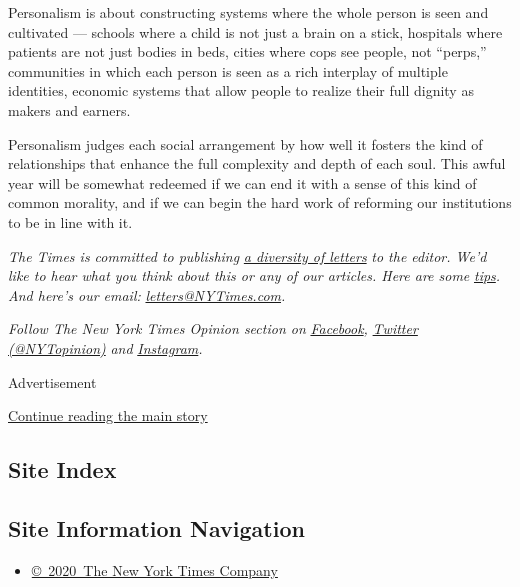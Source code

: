 Personalism is about constructing systems where the whole person is seen
and cultivated --- schools where a child is not just a brain on a stick,
hospitals where patients are not just bodies in beds, cities where cops
see people, not ``perps,'' communities in which each person is seen as a
rich interplay of multiple identities, economic systems that allow
people to realize their full dignity as makers and earners.

Personalism judges each social arrangement by how well it fosters the
kind of relationships that enhance the full complexity and depth of each
soul. This awful year will be somewhat redeemed if we can end it with a
sense of this kind of common morality, and if we can begin the hard work
of reforming our institutions to be in line with it.

\emph{The Times is committed to publishing}
\href{https://www.nytimes3xbfgragh.onion/2019/01/31/opinion/letters/letters-to-editor-new-york-times-women.html}{\emph{a
diversity of letters}} \emph{to the editor. We'd like to hear what you
think about this or any of our articles. Here are some}
\href{https://help.nytimes3xbfgragh.onion/hc/en-us/articles/115014925288-How-to-submit-a-letter-to-the-editor}{\emph{tips}}\emph{.
And here's our email:}
\href{mailto:letters@NYTimes.com}{\emph{letters@NYTimes.com}}\emph{.}

\emph{Follow The New York Times Opinion section on}
\href{https://www.facebookcorewwwi.onion/nytopinion}{\emph{Facebook}}\emph{,}
\href{http://twitter.com/NYTOpinion}{\emph{Twitter (@NYTopinion)}}
\emph{and}
\href{https://www.instagram.com/nytopinion/}{\emph{Instagram}}\emph{.}

Advertisement

\protect\hyperlink{after-bottom}{Continue reading the main story}

\hypertarget{site-index}{%
\subsection{Site Index}\label{site-index}}

\hypertarget{site-information-navigation}{%
\subsection{Site Information
Navigation}\label{site-information-navigation}}

\begin{itemize}
\tightlist
\item
  \href{https://help.nytimes3xbfgragh.onion/hc/en-us/articles/115014792127-Copyright-notice}{©~2020~The
  New York Times Company}
\end{itemize}

